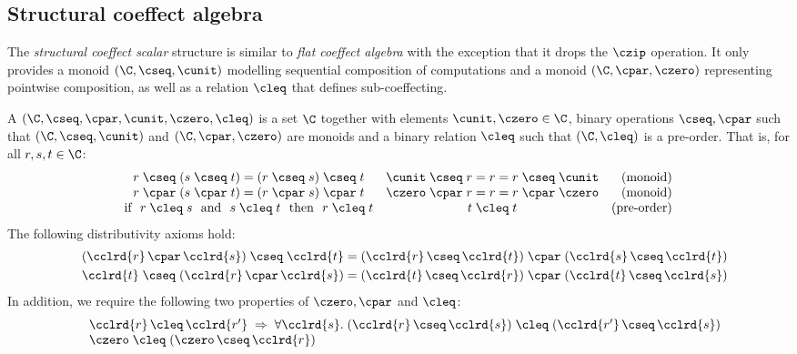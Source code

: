 
\subsection{Structural coeffect algebra}

The \emph{structural coeffect scalar} structure is similar to \emph{flat coeffect algebra} with the
exception that it drops the $\czip$ operation. It only provides a monoid $(\C, \cseq, \cunit)$
modelling sequential composition of computations and a monoid $(\C, \cpar, \czero)$ representing
pointwise composition, as well as a relation $\cleq$ that defines sub-coeffecting.

\begin{definition}
\label{def:structural-scalar}
A \emph{} $(\C, \cseq, \cpar, \cunit, \czero, \cleq)$ is a set
$\C$ together with elements $\cunit, \czero \in \C$, binary operations $\cseq, \cpar$ such that
$(\C, \cseq, \cunit)$ and $(\C, \cpar, \czero)$ are monoids and a binary relation $\cleq$ such
that $(\C, \cleq)$ is a pre-order. That is, for all $r,s,t\in \C$:
%
\begin{equation*}
\begin{array}{ccr}
r \;\cseq\; (s \;\cseq\; t) = (r \;\cseq\; s) \;\cseq\; t  &
\cunit \;\cseq\; r = r = r \;\cseq\; \cunit &
\textnormal{(monoid)}
\\
r \;\cpar\; (s \;\cpar\; t) = (r \;\cpar\; s) \;\cpar\; t &
\czero \;\cpar\; r = r = r \;\cpar\; \czero &
\textnormal{(monoid)}
\\
\textnormal{if}~~r\; \cleq\; s ~~\textnormal{and}~~s\; \cleq\; t~~\textnormal{then}~~r\; \cleq\; t&
t\; \cleq\; t &
\textnormal{(pre-order)}
\\
\end{array}
\end{equation*}
%
The following distributivity axioms hold:
\begin{align*}
\quad (\cclrd{r}\, \cpar\, \cclrd{s}) \;\cseq\; \cclrd{t} & = (\cclrd{r} \,\cseq\, \cclrd{t}) \;\cpar\; (\cclrd{s}\, \cseq\, \cclrd{t}) \\
\quad \cclrd{t} \;\cseq\; (\cclrd{r}\, \cpar\, \cclrd{s}) & = (\cclrd{t} \,\cseq\, \cclrd{r}) \;\cpar\; (\cclrd{t}\, \cseq\, \cclrd{s})
\end{align*}
%
In addition, we require the following two properties of $\czero, \cpar$ and $\cleq$:
\begin{equation*}
\begin{array}{l}
 \quad \cclrd{r}\,\cleq\,\cclrd{r'} \; \Rightarrow \; \forall\cclrd{s}.\;(\cclrd{r}\,\cseq\,\cclrd{s})\;\cleq\;(\cclrd{r'}\,\cseq\,\cclrd{s}) \\
 \quad \czero\;\cleq\;(\czero\,\cseq\,\cclrd{r})
\end{array}
\end{equation*}
\end{definition}

